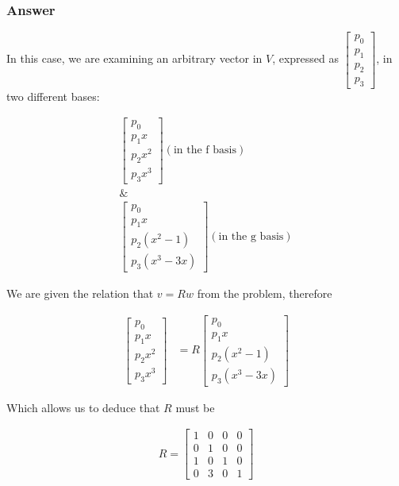 \documentclass{article}
\begin{document}
		\subsubsection{Answer}
		
		In this case, we are examining an arbitrary vector in $V$, expressed as $\begin{bmatrix} p_{0}\\p_{1}\\p_{2}\\p_{3}\end{bmatrix}$, in two different bases:
		
		\begin{align*}
			\begin{bmatrix}p_{0}\\p_{1}x\\p_{2}x^{2}\\p_{3}x^{3}\end{bmatrix}(\text{in the f basis})\\
			\&\\
			\begin{bmatrix}p_{0}\\p_{1}x\\p_{2}(x^{2}-1)\\p_{3}(x^{3}-3x)\end{bmatrix}(\text{in the g basis})
		\end{align*}
		
		We are given the relation that $v=Rw$ from the problem, therefore
		
		\begin{align*}
			\begin{bmatrix}p_{0}\\p_{1}x\\p_{2}x^{2}\\p_{3}x^{3}\end{bmatrix}&=R\begin{bmatrix}p_{0}\\p_{1}x\\p_{2}(x^{2}-1)\\p_{3}(x^{3}-3x)\end{bmatrix}
		\end{align*}
		
		Which allows us to deduce that $R$ must be 
		
		\begin{align*}
			R=
			\begin{bmatrix}
				1 & 0 & 0 & 0\\
				0 & 1 & 0 & 0\\
				1 & 0 & 1 & 0 \\
				0 & 3 & 0 & 1
			\end{bmatrix}
		\end{align*}
		
\end{document}
